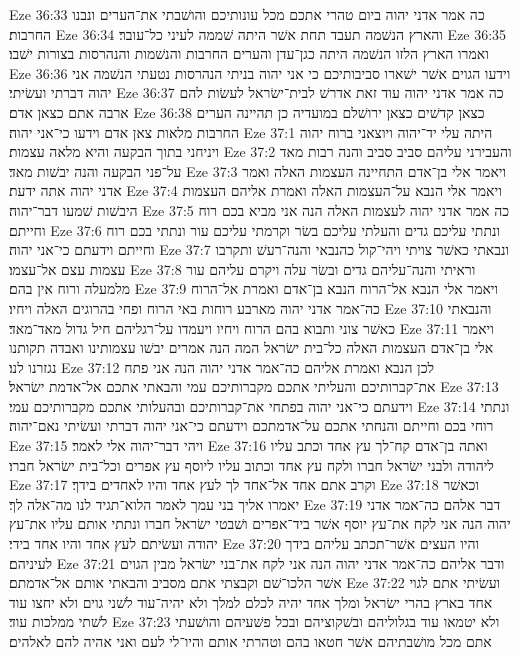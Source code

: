 Eze 36:33  כה אמר אדני יהוה ביום טהרי אתכם מכל עונותיכם והושׁבתי את־הערים ונבנו החרבות׃
Eze 36:34  והארץ הנשׁמה תעבד תחת אשׁר היתה שׁממה לעיני כל־עובר׃
Eze 36:35  ואמרו הארץ הלזו הנשׁמה היתה כגן־עדן והערים החרבות והנשׁמות והנהרסות בצורות ישׁבו׃
Eze 36:36  וידעו הגוים אשׁר ישׁארו סביבותיכם כי אני יהוה בניתי הנהרסות נטעתי הנשׁמה אני יהוה דברתי ועשׂיתי׃
Eze 36:37  כה אמר אדני יהוה עוד זאת אדרשׁ לבית־ישׂראל לעשׂות להם ארבה אתם כצאן אדם׃
Eze 36:38  כצאן קדשׁים כצאן ירושׁלם במועדיה כן תהיינה הערים החרבות מלאות צאן אדם וידעו כי־אני יהוה׃
Eze 37:1  היתה עלי יד־יהוה ויוצאני ברוח יהוה ויניחני בתוך הבקעה והיא מלאה עצמות׃
Eze 37:2  והעבירני עליהם סביב סביב והנה רבות מאד על־פני הבקעה והנה יבשׁות מאד׃
Eze 37:3  ויאמר אלי בן־אדם התחיינה העצמות האלה ואמר אדני יהוה אתה ידעת׃
Eze 37:4  ויאמר אלי הנבא על־העצמות האלה ואמרת אליהם העצמות היבשׁות שׁמעו דבר־יהוה׃
Eze 37:5  כה אמר אדני יהוה לעצמות האלה הנה אני מביא בכם רוח וחייתם׃
Eze 37:6  ונתתי עליכם גדים והעלתי עליכם בשׂר וקרמתי עליכם עור ונתתי בכם רוח וחייתם וידעתם כי־אני יהוה׃
Eze 37:7  ונבאתי כאשׁר צויתי ויהי־קול כהנבאי והנה־רעשׁ ותקרבו עצמות עצם אל־עצמו׃
Eze 37:8  וראיתי והנה־עליהם גדים ובשׂר עלה ויקרם עליהם עור מלמעלה ורוח אין בהם׃
Eze 37:9  ויאמר אלי הנבא אל־הרוח הנבא בן־אדם ואמרת אל־הרוח כה־אמר אדני יהוה מארבע רוחות באי הרוח ופחי בהרוגים האלה ויחיו׃
Eze 37:10  והנבאתי כאשׁר צוני ותבוא בהם הרוח ויחיו ויעמדו על־רגליהם חיל גדול מאד־מאד׃
Eze 37:11  ויאמר אלי בן־אדם העצמות האלה כל־בית ישׂראל המה הנה אמרים יבשׁו עצמותינו ואבדה תקותנו נגזרנו לנו׃
Eze 37:12  לכן הנבא ואמרת אליהם כה־אמר אדני יהוה הנה אני פתח את־קברותיכם והעליתי אתכם מקברותיכם עמי והבאתי אתכם אל־אדמת ישׂראל׃
Eze 37:13  וידעתם כי־אני יהוה בפתחי את־קברותיכם ובהעלותי אתכם מקברותיכם עמי׃
Eze 37:14  ונתתי רוחי בכם וחייתם והנחתי אתכם על־אדמתכם וידעתם כי־אני יהוה דברתי ועשׂיתי נאם־יהוה׃
Eze 37:15  ויהי דבר־יהוה אלי לאמר׃
Eze 37:16  ואתה בן־אדם קח־לך עץ אחד וכתב עליו ליהודה ולבני ישׂראל חברו ולקח עץ אחד וכתוב עליו ליוסף עץ אפרים וכל־בית ישׂראל חברו׃
Eze 37:17  וקרב אתם אחד אל־אחד לך לעץ אחד והיו לאחדים בידך׃
Eze 37:18  וכאשׁר יאמרו אליך בני עמך לאמר הלוא־תגיד לנו מה־אלה לך׃
Eze 37:19  דבר אלהם כה־אמר אדני יהוה הנה אני לקח את־עץ יוסף אשׁר ביד־אפרים ושׁבטי ישׂראל חברו ונתתי אותם עליו את־עץ יהודה ועשׂיתם לעץ אחד והיו אחד בידי׃
Eze 37:20  והיו העצים אשׁר־תכתב עליהם בידך לעיניהם׃
Eze 37:21  ודבר אליהם כה־אמר אדני יהוה הנה אני לקח את־בני ישׂראל מבין הגוים אשׁר הלכו־שׁם וקבצתי אתם מסביב והבאתי אותם אל־אדמתם׃
Eze 37:22  ועשׂיתי אתם לגוי אחד בארץ בהרי ישׂראל ומלך אחד יהיה לכלם למלך ולא יהיה־עוד לשׁני גוים ולא יחצו עוד לשׁתי ממלכות עוד׃
Eze 37:23  ולא יטמאו עוד בגלוליהם ובשׁקוציהם ובכל פשׁעיהם והושׁעתי אתם מכל מושׁבתיהם אשׁר חטאו בהם וטהרתי אותם והיו־לי לעם ואני אהיה להם לאלהים׃
